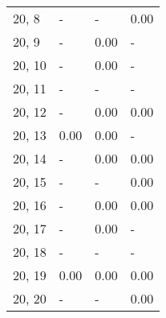 \begin{table}
\begin{tabular}{llll}
20, 8  &     - &     - &  0.00 \\
20, 9  &     - &  0.00 &     - \\
20, 10 &     - &  0.00 &     - \\
20, 11 &     - &     - &     - \\
20, 12 &     - &  0.00 &  0.00 \\
20, 13 &  0.00 &  0.00 &     - \\
20, 14 &     - &  0.00 &  0.00 \\
20, 15 &     - &     - &  0.00 \\
20, 16 &     - &  0.00 &  0.00 \\
20, 17 &     - &  0.00 &     - \\
20, 18 &     - &     - &     - \\
20, 19 &  0.00 &  0.00 &  0.00 \\
20, 20 &     - &     - &  0.00 \\
\bottomrule
\end{tabular}
\end{table}

